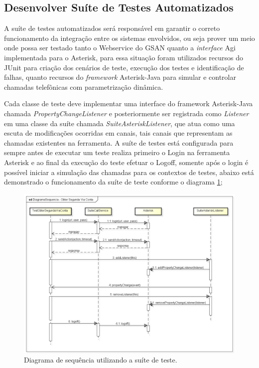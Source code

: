 \subsection{Desenvolver Suíte de Testes Automatizados}

A suíte de testes automatizados será responsável em garantir o correto funcionamento da integração entre os sistemas envolvidos, ou seja prover um meio onde possa ser testado tanto o Webservice do GSAN quanto a \textit{interface} Agi implementada para o Asterisk, para essa situação foram utilizados recursos do JUnit para criação dos cenários de teste, execução dos testes e identificação de falhas, quanto recursos do \textit{framework} Asterisk-Java para simular e controlar chamadas telefônicas com parametrização dinâmica.   

Cada classe de teste deve implementar uma interface do framework Asterisk-Java chamada \textit{PropertyChangeListener} e posteriormente ser registrada como \textit{Listener} em uma classe da suíte chamada \textit{SuiteAsteriskListener}, que atua como uma escuta de modificações ocorridas em  canais, tais canais que representam as chamadas existentes na ferramenta. 
A suíte de testes está configurada para sempre antes de executar um teste realiza primeiro o Login na ferramenta Asterisk e ao final da execução do teste efetuar o Logoff, somente após o login é possível iniciar a simulação das chamadas para os contextos de testes, abaixo está demonstrado o funcionamento da suíte de teste conforme o diagrama \ref{figura:diagramaSeq2Via};

\begin{figure}[!htb]
	\centering
	\caption{Diagrama de sequência utilizando a suíte de teste.}
	\label{figura:diagramaSeq2Via}
	\includegraphics{figuras/diagramaSequenciaObter2ViaTest.png}
\end{figure}

